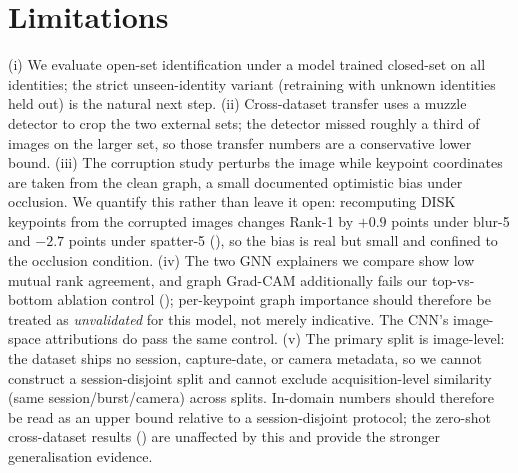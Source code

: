 \documentclass[11pt]{article}
\begin{document}
\section{Limitations}\label{sec:limitations}
(i) We
evaluate open-set identification under a model trained closed-set on all identities; the
strict unseen-identity variant (retraining with unknown identities held out) is the natural
next step. (ii) Cross-dataset transfer uses a muzzle detector to crop the two external
sets; the detector missed roughly a third of images on the larger set, so those transfer
numbers are a conservative lower bound. (iii) The corruption study perturbs the image while
keypoint coordinates are taken from the clean graph, a small documented optimistic bias
under occlusion. We quantify this rather than leave it open: recomputing DISK keypoints from
the corrupted images changes Rank-1 by $+0.9$ points under blur-5 and $-2.7$ points under
spatter-5 (), so the bias is real but small and confined to the occlusion
condition. (iv) The two GNN explainers we compare show
low mutual rank agreement, and graph Grad-CAM additionally fails our top-vs-bottom ablation control (); per-keypoint graph importance should therefore be treated as \emph{unvalidated} for this model, not merely indicative. The CNN's image-space attributions do pass the same control.
(v) The primary split is image-level: the dataset ships no session, capture-date, or camera
metadata, so we cannot construct a session-disjoint split and cannot exclude
acquisition-level similarity (same session/burst/camera) across splits. In-domain numbers
should therefore be read as an upper bound relative to a session-disjoint protocol; the
zero-shot cross-dataset results () are unaffected by this and provide the
stronger generalisation evidence.
\end{document}
